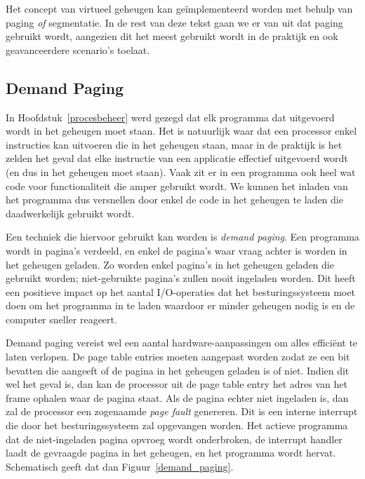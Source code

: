 Het concept van virtueel geheugen kan ge\"implementeerd worden met behulp van paging \emph{of} segmentatie. In de rest van deze tekst gaan we er van uit dat paging gebruikt wordt, aangezien dit het meest gebruikt wordt in de praktijk en ook geavanceerdere scenario's toelaat.

\subsection{Demand Paging}

In Hoofdstuk~\ref{procesbeheer} werd gezegd dat elk programma dat uitgevoerd wordt in het geheugen moet staan. Het is natuurlijk waar dat een processor enkel instructies kan uitvoeren die in het geheugen staan, maar in de praktijk is het zelden het geval dat elke instructie van een applicatie effectief uitgevoerd wordt (en dus in het geheugen moet staan). Vaak zit er in een programma ook heel wat code voor functionaliteit die amper gebruikt wordt. We kunnen het inladen van het programma dus versnellen door enkel de code in het geheugen te laden die daadwerkelijk gebruikt wordt.

Een techniek die hiervoor gebruikt kan worden is \emph{demand paging}. Een programma wordt in pagina's verdeeld, en enkel de pagina's waar vraag achter is worden in het geheugen geladen. Zo worden enkel pagina's in het geheugen geladen die gebruikt worden; niet-gebruikte pagina's zullen nooit ingeladen worden. Dit heeft een positieve impact op het aantal I/O-operaties dat het besturingssysteem moet doen om het programma in te laden waardoor er minder geheugen nodig is en de computer sneller reageert.

Demand paging vereist wel een aantal hardware-aanpassingen om alles effici\"ent te laten verlopen. De page table entries moeten aangepast worden zodat ze een bit bevatten die aangeeft of de pagina in het geheugen geladen is of niet. Indien dit wel het geval is, dan kan de processor uit de page table entry het adres van het frame ophalen waar de pagina staat. Als de pagina echter niet ingeladen is, dan zal de processor een zogenaamde \emph{page fault} genereren. Dit is een interne interrupt die door het besturingssysteem zal opgevangen worden. Het actieve programma dat de niet-ingeladen pagina opvroeg wordt onderbroken, de interrupt handler laadt de gevraagde pagina in het geheugen, en het programma wordt hervat. Schematisch geeft dat dan Figuur~\ref{demand_paging}.

